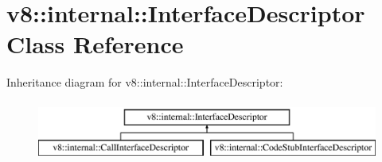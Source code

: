 \hypertarget{classv8_1_1internal_1_1_interface_descriptor}{}\section{v8\+:\+:internal\+:\+:Interface\+Descriptor Class Reference}
\label{classv8_1_1internal_1_1_interface_descriptor}
Inheritance diagram for v8\+:\+:internal\+:\+:Interface\+Descriptor\+:\begin{figure}[H]
\begin{center}
\leavevmode
\includegraphics[height=2.000000cm]{classv8_1_1internal_1_1_interface_descriptor}
\end{center}
\end{figure}
